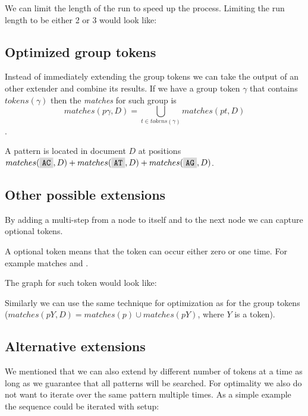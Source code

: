 We can limit the length of the run to speed up the process. Limiting the run length to be either 2 or 3 would look like:

\begin{figure}[H]
	
\end{figure}

\subsection{Optimized group tokens}

Instead of immediately extending the group tokens we can take the output of an other extender and combine its results. If we have a group token $\gamma$ that contains $tokens(\gamma)$ then the \emph{matches} for such group is $$matches(p\gamma, D) = \bigcup_{t \in tokens(\gamma)} matches(pt, D) $$.

\begin{exmp}
A pattern  is located in document $D$ at positions $matches(\R{AC}, D) + matches(\R{AT}, D) + matches(\R{AG}, D)$.
\end{exmp}

\subsection{Other possible extensions}

By adding a multi-step from a node to itself and to the next node we can capture optional tokens.

\begin{exmp}
A optional token  means that the token  can occur either zero or one time. For example  matches  and .
\end{exmp}

The graph for such token would look like:

\begin{figure}[H]
	
\end{figure}

 Similarly we can use the same technique for optimization as for the group tokens ($matches(pY, D) = matches(p) \cup matches(pY)$, where $Y$ is a token).

\subsection{Alternative extensions}

We mentioned that we can also extend by different number of tokens at a time as long as we guarantee that all patterns will be searched. For optimality we also do not want to iterate over the same pattern multiple times. As a simple example the sequence  could be iterated with setup:

